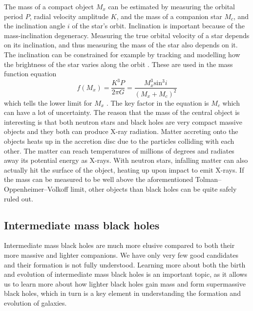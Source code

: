 \documentclass[english, oneside]{HYgradu}
\begin{document}
The mass of a compact object $M_x$ can be estimated by measuring the orbital period $P$, radial velocity amplitude $K$, and the mass of a companion star $M_c$, and the inclination angle $i$ of the star's orbit. Inclination is important because of the mass-inclination degeneracy. Measuring the true orbital velocity of a star depends on its inclination, and thus measuring the mass of the star also depends on it. The inclination can be constrained for example by tracking and modelling how the brightness of the star varies along the orbit \citep{kerkwijk:2011}. These are used in the mass function equation 
\begin{equation}
f(M_x) = \frac{K^3 P}{2 \pi G} = \frac{M_x^3 \mathrm{sin}^3 i}{(M_x + M_c)^2}
\end{equation}
which tells the lower limit for $M_x$ \citep{casares:2007}. The key factor in the equation is $M_c$ which can have a lot of uncertainty. The reason that the mass of the central object is interesting is that both neutron stars and black holes are very compact massive objects and they both can produce X-ray radiation. Matter accreting onto the objects heats up in the accretion disc due to the particles colliding with each other. The matter can reach temperatures of millions of degrees and radiates away its potential energy as X-rays. With neutron stars, infalling matter can also actually hit the surface of the object, heating up upon impact to emit X-rays. If the mass can be measured to be well above the aforementioned Tolman–Oppenheimer–Volkoff limit, other objects than black holes can be quite safely ruled out.




\subsection{Intermediate mass black holes}

Intermediate mass black holes are much more elusive compared to both their more massive and lighter companions. We have only very few good candidates and their formation is not fully understood. Learning more about both the birth and evolution of intermediate mass black holes is an important topic, as it allows us to learn more about how lighter black holes gain mass and form supermassive black holes, which in turn is a key element in understanding the formation and evolution of galaxies.
\end{document}
